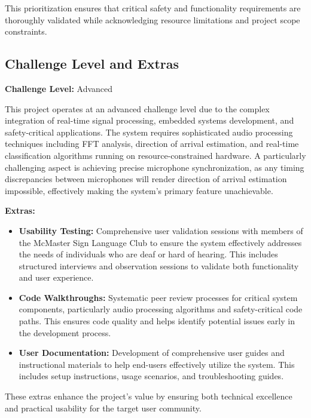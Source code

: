 \documentclass[12pt, titlepage]{article}
\begin{document}
This prioritization ensures that critical safety and functionality requirements
are thoroughly validated while acknowledging resource limitations and project
scope constraints.

\subsection{Challenge Level and Extras}

\textbf{Challenge Level:} Advanced

This project operates at an advanced challenge level due to the complex
integration of real-time signal processing, embedded systems development, and
safety-critical applications. The system requires sophisticated audio processing
techniques including FFT analysis, direction of arrival estimation, and
real-time classification algorithms running on resource-constrained hardware. A
particularly challenging aspect is achieving precise microphone synchronization,
as any timing discrepancies between microphones will render direction of arrival
estimation impossible, effectively making the system's primary feature
unachievable.

\textbf{Extras:}
\begin{itemize}
    \item \textbf{Usability Testing:} Comprehensive user validation sessions
    with members of the McMaster Sign Language Club to ensure the system
    effectively addresses the needs of individuals who are deaf or hard of
    hearing. This includes structured interviews and observation sessions to
    validate both functionality and user experience.
    
    \item \textbf{Code Walkthroughs:} Systematic peer review processes for
    critical system components, particularly audio processing algorithms and
    safety-critical code paths. This ensures code quality and helps identify
    potential issues early in the development process.
    
    \item \textbf{User Documentation:} Development of comprehensive user guides
    and instructional materials to help end-users effectively utilize the
    system. This includes setup instructions, usage scenarios, and
    troubleshooting guides.
\end{itemize}

These extras enhance the project's value by ensuring both technical excellence
and practical usability for the target user community.
\end{document}

